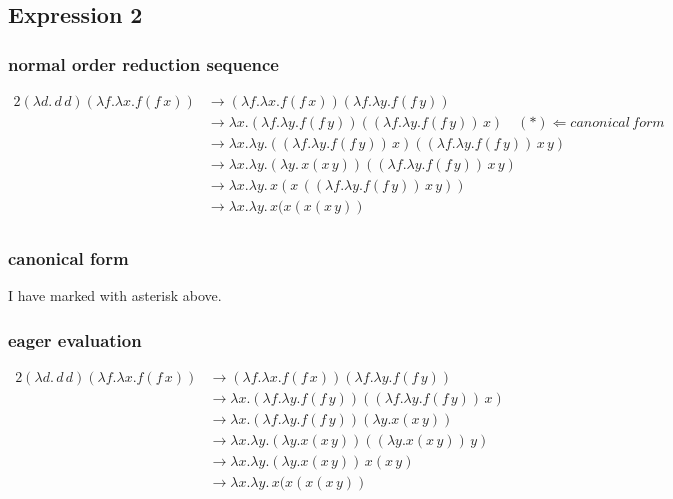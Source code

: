 \documentclass[a4papers]{ctexart}
\begin{document}
\subsection{Expression 2}
\subsubsection{normal order reduction sequence}
\begin{alignat*}{2}
    (\lambda d.\, d \, d) (\lambda f.\lambda x. f(f\, x))
    &\rightarrow (\lambda f.\lambda x. f(f\, x))(\lambda f.\lambda y. f(f\, y))\\
    &\rightarrow \lambda x. (\lambda f.\lambda y. f(f\, y))((\lambda f.\lambda y. f(f\, y))\, x) \quad (*) \Leftarrow canonical\, form \\
    &\rightarrow \lambda x. \lambda y. ((\lambda f.\lambda y. f(f\, y))\, x)((\lambda f.\lambda y. f(f\, y))\, x\, y)\\
    &\rightarrow \lambda x. \lambda y. (\lambda y. \, x(x\, y))((\lambda f.\lambda y. f(f\, y))\, x\, y)\\
    &\rightarrow \lambda x. \lambda y.  \, x(x\, ((\lambda f.\lambda y. f(f\, y))\, x\, y))\\
    &\rightarrow \lambda x. \lambda y.  \, x(x(x(x\, y))\\
\end{alignat*}
\subsubsection{canonical form}
I have marked with asterisk above. 
\subsubsection{eager evaluation}
\begin{alignat*}{2}
    (\lambda d.\, d \, d) (\lambda f.\lambda x. f(f\, x))
    &\rightarrow (\lambda f.\lambda x. f(f\, x))(\lambda f.\lambda y. f(f\, y))\\
    &\rightarrow \lambda x. (\lambda f.\lambda y. f(f\, y))((\lambda f.\lambda y. f(f\, y))\, x) \\
    &\rightarrow \lambda x. (\lambda f.\lambda y. f(f\, y))(\lambda y. x(x\, y)) \\
    &\rightarrow \lambda x. \lambda y. (\lambda y. x(x\, y))((\lambda y. x(x\, y))\, y)\\
    &\rightarrow \lambda x. \lambda y. (\lambda y. x(x\, y))\, x(x\, y)\\
    &\rightarrow \lambda x. \lambda y.  \, x(x(x(x\, y))\\
\end{alignat*}
\end{document}
